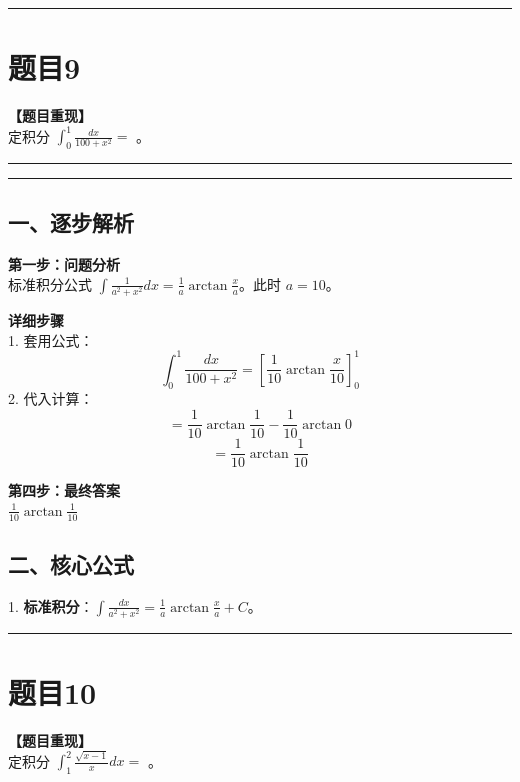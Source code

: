 \documentclass[12pt, a4paper]{ctexart}
\newcommand{\TopSeparator}{
    \par\noindent\rule{\textwidth}{1.5pt}\vspace{0.5em} %
}
\newcommand{\AnalysisSeparator}{
    \par\noindent\rule{\textwidth}{0.5pt}\vspace{0.2em}\hrule\vspace{0.5em} %
}
\newenvironment{RedAnalysis}{
    \par
    \color{red} %
}{
    \par
    \color{black} %
}
\begin{document}
\vspace{2em}

\TopSeparator
\section*{题目9}

\textbf{【题目重现】} \\
定积分 $ \int_{0}^{1}\frac{dx}{100+x^{2}}= $ \underline{\hspace{2cm}}。

\AnalysisSeparator

\begin{RedAnalysis}

\subsection*{一、逐步解析}

\textbf{第一步：问题分析} \\
标准积分公式 $\int \frac{1}{a^2+x^2} dx = \frac{1}{a} \arctan \frac{x}{a}$。此时 $a=10$。

\textbf{详细步骤} \\
1. 套用公式：
   \[ \int_{0}^{1}\frac{dx}{100+x^{2}} = [\frac{1}{10} \arctan \frac{x}{10}]_0^1 \]
2. 代入计算：
   \[ = \frac{1}{10} \arctan \frac{1}{10} - \frac{1}{10} \arctan 0 \]
   \[ = \frac{1}{10} \arctan \frac{1}{10} \]

\textbf{第四步：最终答案} \\
$ \frac{1}{10} \arctan \frac{1}{10} $

\subsection*{二、核心公式}
1. \textbf{标准积分}：$\int \frac{dx}{a^2+x^2} = \frac{1}{a} \arctan \frac{x}{a} + C$。

\end{RedAnalysis}

\vspace{2em}

\TopSeparator
\section*{题目10}

\textbf{【题目重现】} \\
定积分 $ \int_{1}^{2}\frac{\sqrt{x-1}}{x}dx= $ \underline{\hspace{2cm}}。
\end{document}
